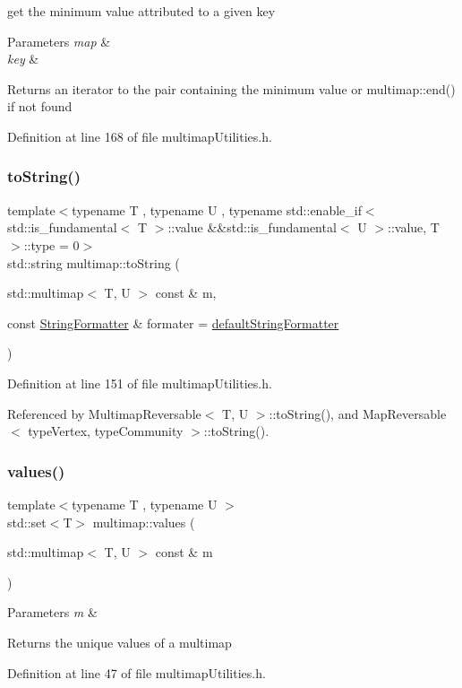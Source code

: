 get the minimum value attributed to a given key 
\begin{DoxyParams}{Parameters}
{\em map} & \\
\hline
{\em key} & \\
\hline
\end{DoxyParams}
\begin{DoxyReturn}{Returns}
an iterator to the pair containing the minimum value or multimap\+::end() if not found 
\end{DoxyReturn}


Definition at line 168 of file multimap\+Utilities.\+h.

\mbox{\label{namespacemultimap_aa170f94901a505969ecfa010c24f2877}} 
\subsubsection{\texorpdfstring{to\+String()}{toString()}}
{\footnotesize\ttfamily template$<$typename T , typename U , typename std\+::enable\+\_\+if$<$ std\+::is\+\_\+fundamental$<$ T $>$\+::value \&\&std\+::is\+\_\+fundamental$<$ U $>$\+::value, T $>$\+::type  = 0$>$ \\
std\+::string multimap\+::to\+String (\begin{DoxyParamCaption}\item[{std\+::multimap$<$ T, U $>$ const \&}]{m,  }\item[{const \hyperlink{classStringFormatter}{String\+Formatter} \&}]{formater = {\ttfamily \hyperlink{stringFormatter_8h_abf1349c8e24162d0134072aff288f2a2}{default\+String\+Formatter}} }\end{DoxyParamCaption})}



Definition at line 151 of file multimap\+Utilities.\+h.



Referenced by Multimap\+Reversable$<$ T, U $>$\+::to\+String(), and Map\+Reversable$<$ type\+Vertex, type\+Community $>$\+::to\+String().

\mbox{\label{namespacemultimap_a0b99e1d5a2730d58caee6e020509da9d}} 
\subsubsection{\texorpdfstring{values()}{values()}}
{\footnotesize\ttfamily template$<$typename T , typename U $>$ \\
std\+::set$<$T$>$ multimap\+::values (\begin{DoxyParamCaption}\item[{std\+::multimap$<$ T, U $>$ const \&}]{m }\end{DoxyParamCaption})}


\begin{DoxyParams}{Parameters}
{\em m} & \\
\hline
\end{DoxyParams}
\begin{DoxyReturn}{Returns}
the unique values of a multimap 
\end{DoxyReturn}


Definition at line 47 of file multimap\+Utilities.\+h.

